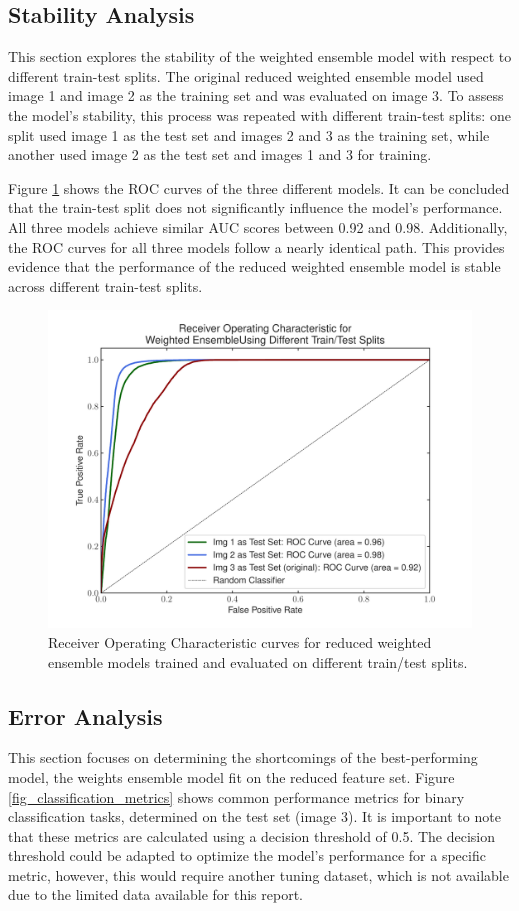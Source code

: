 \documentclass[11pt,letterpaper]{article}
\begin{document}
\subsection{Stability Analysis}
This section explores the stability of the weighted ensemble model with respect to different train-test splits. The original reduced weighted ensemble model used image 1 and image 2 as the training set and was evaluated on image 3. To assess the model's stability, this process was repeated with different train-test splits: one split used image 1 as the test set and images 2 and 3 as the training set, while another used image 2 as the test set and images 1 and 3 for training.

Figure \ref{fig_roc_stability} shows the ROC curves of the three different models. It can be concluded that the train-test split does not significantly influence the model's performance. All three models achieve similar AUC scores between 0.92 and 0.98. Additionally, the ROC curves for all three models follow a nearly identical path. This provides evidence that the performance of the reduced weighted ensemble model is stable across different train-test splits.

\begin{figure}[H]
    \centering
    \includegraphics[width=\linewidth]{figs/roc_stability.pdf}
    \caption{Receiver Operating Characteristic curves for reduced weighted ensemble models trained and evaluated on different train/test splits.}
    \label{fig_roc_stability}
\end{figure}

\subsection{Error Analysis}
This section focuses on determining the shortcomings of the best-performing model, the weights ensemble model fit on the reduced feature set. Figure \ref{fig_classification_metrics} shows common performance metrics for binary classification tasks, determined on the test set (image 3). It is important to note that these metrics are calculated using a decision threshold of 0.5. The decision threshold could be adapted to optimize the model's performance for a specific metric, however, this would require another tuning dataset, which is not available due to the limited data available for this report.
\end{document}
